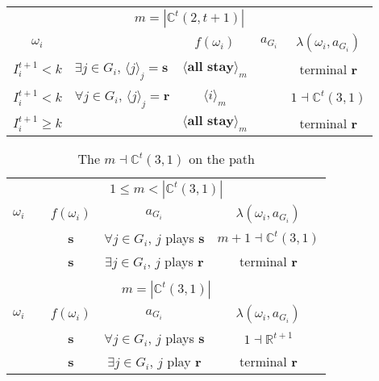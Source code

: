 \documentclass[12pt,letter]{article}
\newcommand{\Kappa}{\mathbb{C}}
\newcommand{\Omicron}{\mathbb{R}}
\theoremstyle{definition}
\theoremstyle{definition}
\theoremstyle{remark}
\theoremstyle{claim}
\begin{document}
\begin{table}[!htbp]
\begin{center}
\begin{tabular}{c l | c | c | c}
\multicolumn{5}{c}{$m= |\Kappa^t(2,t+1)|$}\\
$\omega_i$ 	 & 	   &	$f(\omega_i)$  &	$a_{G_i}$ & $\lambda(\omega_i,a_{G_i})$ \\
\hline
\hline
$I^{t+1}_i< k$  	& 	$\exists j\in G_i$, $\langle j \rangle_j=\textbf{s}$	& $\langle \textbf{all stay} \rangle_m$		&  	& terminal \textbf{r}\\
$I^{t+1}_i< k$  	& 	$\forall j\in G_i$, $\langle j \rangle_j=\textbf{r}$	& $\langle i \rangle_m$		&  	& $1\dashv \Kappa^t(3,1)$\\
$I^{t+1}_i\geq k$	 & 				& $\langle \textbf{all stay} \rangle_m$ 	& 		& terminal \textbf{r}\\
\hline
\end{tabular}
\end{center}
\end{table}




\clearpage









\begin{table}[!htbp]
\caption{The $m\dashv\Kappa^t(3,1)$ on the path}
\label{table:eqm_path_kt3}
\begin{center}
\begin{tabular}{c c | c | c | c}
\multicolumn{5}{c}{$1\leq m < |\Kappa^t(3,1)|$}\\
$\omega_i$ 	 & 	   &	$f(\omega_i)$  &	$a_{G_i}$ & $\lambda(\omega_i,a_{G_i})$ \\
\hline
\hline
  	&	& \textbf{s} & $\forall j\in G_i$, $j$ plays $\textbf{s}$ 	& $m+1\dashv \Kappa^t(3,1)$\\
  	&  & \textbf{s}  &  $\exists j\in G_i$, $j$ plays $\textbf{r}$  	& terminal \textbf{r}\\
\hline
\\
\multicolumn{5}{c}{$m= |\Kappa^t(3,1)|$}\\
$\omega_i$ 	 & 	   &	$f(\omega_i)$  &	$a_{G_i}$ & $\lambda(\omega_i,a_{G_i})$ \\
\hline
\hline
 	& 	& \textbf{s} & $\forall j\in G_i$, $j$ plays $\textbf{s}$ 	& $1\dashv \Omicron^{t+1}$\\
  	&  & \textbf{s}  &  $\exists j\in G_i$, $j$ play $\textbf{r}$  	& terminal \textbf{r}\\
\hline
\end{tabular}
\end{center}
\end{table}
\end{document}
